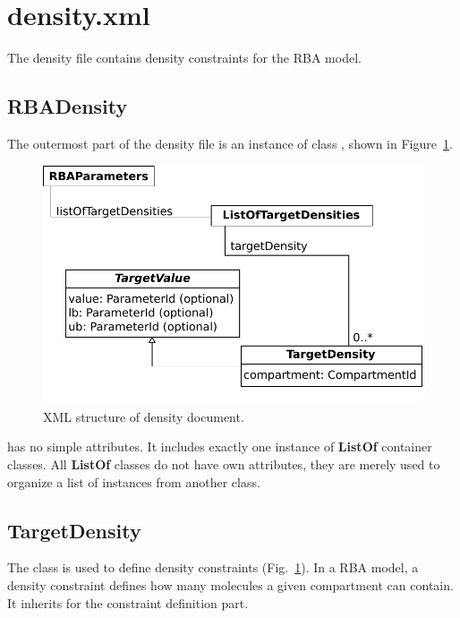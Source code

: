 
\section{density.xml}

The density file contains density constraints for the RBA model.


\subsection{RBADensity}
\label{sec:rba_density}

The outermost part of the density file is an instance of class
\rbadensity, shown in Figure~\ref{fig:density_doc}.

\begin{figure}
  \centering
  \includegraphics[scale=0.8]{figures/density_doc}
  \caption{XML structure of density document.}
\label{fig:density_doc}
\end{figure}

\rbadensity{} has no simple attributes.
It includes exactly one instance of \textbf{ListOf} container classes.
All \textbf{ListOf} classes do not have own attributes,
they are merely used to organize a list of instances from another class.

\subsection{TargetDensity}
\label{sec:target_density}

The \targetdensity{} class is used to define density constraints
(Fig.~\ref{fig:density_doc}).
In a RBA model, a density constraint defines how many molecules
a given compartment can contain.
It inherits \targetvalue{} for the constraint definition part.

